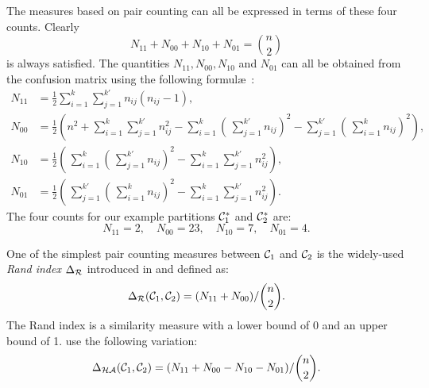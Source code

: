 The measures based on pair counting can all be expressed in terms of these
four counts.  Clearly \[N_{11}+N_{00}+N_{10}+N_{01} = \binom{n}{2}\] is always
satisfied.  The quantities $N_{11},N_{00},N_{10}$ and $N_{01}$ can all be
obtained from the confusion matrix using the following formul\ae\
\citep{hubert-arabie-1985}:
\begin{align*}
  N_{11} &= \frac{1}{2} \sum_{i=1}^{k} \sum_{j=1}^{k'} n_{ij}(n_{ij}-1),\\
  N_{00} &= \frac{1}{2} \left(n^2 + \sum_{i=1}^{k} \sum_{j=1}^{k'} n_{ij}^2
                             - \sum_{i=1}^{k}
                                \left(\,\sum_{j=1}^{k'} n_{ij} \right)^2
                             - \sum_{j=1}^{k'}
                                \left(\,\sum_{i=1}^{k} n_{ij} \right)^2
                       \right),\\
  N_{10} &= \frac{1}{2} \left(\,\sum_{i=1}^{k}
                              \left(\,\sum_{j=1}^{k'} n_{ij} \right)^2
                             - \sum_{i=1}^{k} \sum_{j=1}^{k'} n_{ij}^2
                       \right),\\
  N_{01} &= \frac{1}{2} \left(\,\sum_{j=1}^{k'}
                              \left(\,\sum_{i=1}^{k} n_{ij} \right)^2
                             - \sum_{i=1}^{k} \sum_{j=1}^{k'} n_{ij}^2
                       \right).
\end{align*}
The four counts for our example partitions $\mathcal{C}^*_1$ and $\mathcal{C}^*_2$ are:
\begin{equation*}
  N_{11} = 2,\quad
  N_{00} = 23,\quad
  N_{10} = 7,\quad
  N_{01} = 4.
\end{equation*}

One of the simplest pair counting measures between $\mathcal{C}_1$ and $\mathcal{C}_2$ is
the widely-used \textit{Rand index} $\Delta_{\mathcal{R}}$ introduced in
\citep{rand-1971} and defined as:
\begin{equation*}
\Delta_{\mathcal{R}}(\mathcal{C}_1,\mathcal{C}_2) = (N_{11}+N_{00})/\binom{n}{2}.
\end{equation*}
The Rand index is a similarity measure with a lower bound of 0 and an upper
bound of 1.  \citet{hubert-arabie-1985} use the following variation:
\[\Delta_{\mathcal{HA}}(\mathcal{C}_1,\mathcal{C}_2) = (N_{11}+N_{00}-N_{10}-N_{01})/\binom{n}{2}.\]

